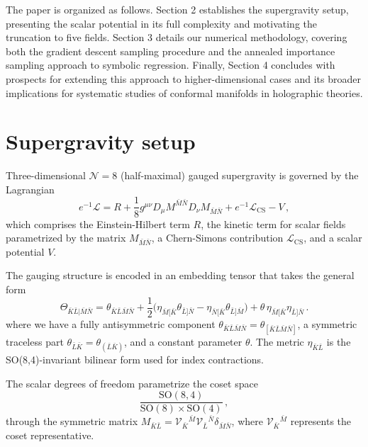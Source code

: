 \documentclass[11pt]{article}
\newcommand{\bK}{{\bar{K}}}
\newcommand{\bL}{{\bar{L}}}
\newcommand{\bM}{{\bar{M}}}
\newcommand{\bN}{{\bar{N}}}
\begin{document}
The paper is organized as follows. Section 2 establishes the supergravity setup, presenting the scalar potential in its full complexity and motivating the truncation to five fields. Section 3 details our numerical methodology, covering both the gradient descent sampling procedure and the annealed importance sampling approach to symbolic regression. Finally, Section 4 concludes with prospects for extending this approach to higher-dimensional cases and its broader implications for systematic studies of conformal manifolds in holographic theories.

\section{Supergravity setup}
	
Three-dimensional $\mathcal{N}=8$ (half-maximal) gauged supergravity is governed by the Lagrangian
%
\begin{equation}	\label{eq: lagrangian_rephrased} 
	e^{-1}\mathcal{L}=R+\frac1{8}g^{\mu\nu}D_\mu M^{\bM\bN}D_\nu M_{\bM\bN}+e^{-1}\mathcal{L}_{\text{CS}}-V\,,
\end{equation}
%
which comprises the Einstein-Hilbert term $R$, the kinetic term for scalar fields parametrized by the matrix $M_{\bM\bN}$, a Chern-Simons contribution $\mathcal{L}_{\text{CS}}$, and a scalar potential $V$.

The gauging structure is encoded in an embedding tensor that takes the general form
%
\begin{equation}	\label{eq: embtensor_rephrased}
	\Theta_{\bK\bL\vert\bM\bN}=\theta_{\bK\bL\bM\bN}+\frac12\Big(\eta_{\bM[\bK}\theta_{\bL]\bN}-\eta_{\bN[\bK}\theta_{\bL]\bM}\Big)+\theta\,\eta_{\bM[\bK}\eta_{\bL]\bN}\,.
\end{equation}
%
where we have a fully antisymmetric component $\theta_{\bK\bL\bM\bN}=\theta_{[\bK\bL\bM\bN]}$, a symmetric traceless part $\theta_{\bL\bK}=\theta_{(\bL\bK)}$, and a constant parameter $\theta$. The metric $\eta_{\bK\bL}$ is the SO(8,4)-invariant bilinear form used for index contractions.

The scalar degrees of freedom parametrize the coset space
%
\begin{equation}	\label{eq: scalarcoset_rephrased}
	\frac{\text{SO}(8,4)}{\text{SO}(8)\times\text{SO}(4)}\,,
\end{equation}
%
through the symmetric matrix $M_{\bK\bL}=\mathcal{V}_{\bK}{}^{\bM}\mathcal{V}_{\bL}{}^{\bN}\delta_{\bM\bN}$, where $\mathcal{V}_{\bK}{}^{\bM}$ represents the coset representative. 
\end{document}
